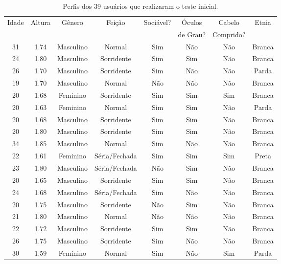 \begin{table}[!ht]
	\caption{Perfis dos 39 usuários que realizaram o teste inicial.}
	\label{tab:perfilamostra}
	\centering
	\begin{tabular}{c | c | c | c | c | c | c | c}
        \hline
        Idade & Altura & Gênero & Feição & Sociável? & Óculos & Cabelo & Etnia \\
         &  &  &  &  & de Grau? & Comprido? &  \\ \hline
        31 & 1.74 & Masculino & Normal & Sim & Não & Não & Branca \\ \hline
        24 & 1.80 & Masculino & Sorridente & Sim & Sim & Não & Branca \\ \hline
        26 & 1.70 & Masculino & Sorridente & Sim & Não & Não & Parda \\ \hline
        19 & 1.70 & Masculino & Normal & Não & Não & Não & Branca \\ \hline
        20 & 1.68 & Feminino & Sorridente & Sim & Sim & Sim & Branca \\ \hline
        20 & 1.63 & Feminino & Normal & Sim & Sim & Não & Parda \\ \hline
        20 & 1.68 & Masculino & Sorridente & Sim & Sim & Não & Branca \\ \hline
        20 & 1.80 & Masculino & Sorridente & Sim & Sim & Não & Branca \\ \hline
        34 & 1.85 & Masculino & Normal & Sim & Não & Não & Branca \\ \hline
        22 & 1.61 & Feminino & Séria/Fechada & Sim & Sim & Sim & Preta \\ \hline
        23 & 1.80 & Masculino & Séria/Fechada & Não & Sim & Não & Branca \\ \hline
        20 & 1.65 & Masculino & Sorridente & Sim & Sim & Não & Branca \\ \hline
        24 & 1.68 & Masculino & Séria/Fechada & Sim & Não & Não & Branca \\ \hline
        20 & 1.75 & Masculino & Sorridente & Não & Sim & Não & Branca \\ \hline
        21 & 1.80 & Masculino & Normal & Não & Não & Não & Branca \\ \hline
        22 & 1.72 & Masculino & Sorridente & Sim & Sim & Não & Branca \\ \hline
        26 & 1.75 & Masculino & Sorridente & Sim & Não & Não & Branca \\ \hline
        30 & 1.59 & Feminino & Normal & Sim & Não & Sim & Parda \\ \hline

\end{tabular}
\end{table}
